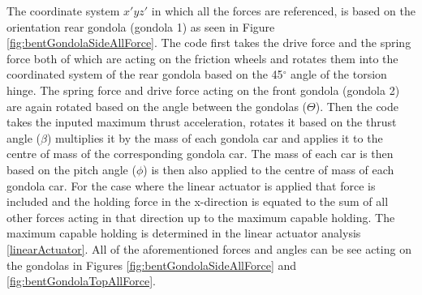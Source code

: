 \documentclass[../main.tex]{subfiles}
\begin{document}
The coordinate system $x'yz'$ in which all the forces are referenced, is based on the orientation rear gondola (gondola 1) as seen in Figure \ref{fig:bentGondolaSideAllForce}. The code first takes the drive force and the spring force both of which are acting on the friction wheels and rotates them into the coordinated system of the rear gondola based on the 45$^{\circ}$ angle of the torsion hinge. The spring force and drive force acting on the front gondola (gondola 2) are again rotated based on the angle between the gondolas ($\Theta$). Then the code takes the inputed maximum thrust acceleration, rotates it based on the thrust angle ($\beta$) multiplies it by the mass of each gondola car and applies it to the centre of mass of the corresponding gondola car. The mass of each car is then based on the pitch angle ($\phi$) is then also applied to the centre of mass of each gondola car. For the case where the linear actuator is applied that force is included and the holding force in the x-direction is equated to the sum of all other forces acting in that direction up to the maximum capable holding. The maximum capable holding is determined in the linear actuator analysis \ref{linearActuator}. All of the aforementioned forces and angles can be see acting on the gondolas in Figures \ref{fig:bentGondolaSideAllForce} and \ref{fig:bentGondolaTopAllForce}. \\
\end{document}

